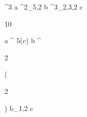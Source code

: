 \begin{eqcode}{\mu}{}{}{^3}
  a \in {}^2_{5,2} \lend
  b \in {}^3_{2,3,2} \lend
  c \gets
  \begin{tmatrix}
  10  \lend
  \end{tmatrix} \lend
   \lend
  a \gets \genar \limits ^ {5}(c) \lend
  b \gets \genar \limits ^ {  \begin{tmatrix}
  2  \lend
  \end{tmatrix} }( \begin{tmatrix}
  2  \lend
  \end{tmatrix})  \lend
   \lend
  b_{1,2} \gets  c \lend
   \lend
   \lend
\end{eqcode}
